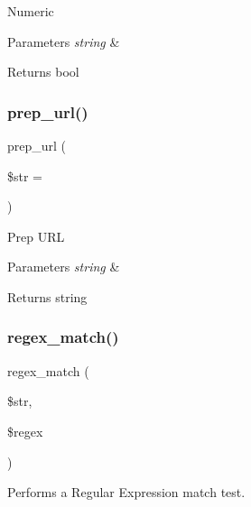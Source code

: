 Numeric


\begin{DoxyParams}{Parameters}
{\em string} & \\
\hline
\end{DoxyParams}
\begin{DoxyReturn}{Returns}
bool 
\end{DoxyReturn}
\mbox{\label{class_c_i___form__validation_a1218a70d68fe797013a53b3c7cd41d2f}} 
\subsubsection{\texorpdfstring{prep\+\_\+url()}{prep\_url()}}
{\footnotesize\ttfamily prep\+\_\+url (\begin{DoxyParamCaption}\item[{}]{\$str = {\ttfamily \textquotesingle{}\textquotesingle{}} }\end{DoxyParamCaption})}

Prep U\+RL


\begin{DoxyParams}{Parameters}
{\em string} & \\
\hline
\end{DoxyParams}
\begin{DoxyReturn}{Returns}
string 
\end{DoxyReturn}
\mbox{\label{class_c_i___form__validation_acef19e29276dbdd2c69dffd5ec635600}} 
\subsubsection{\texorpdfstring{regex\+\_\+match()}{regex\_match()}}
{\footnotesize\ttfamily regex\+\_\+match (\begin{DoxyParamCaption}\item[{}]{\$str,  }\item[{}]{\$regex }\end{DoxyParamCaption})}

Performs a Regular Expression match test.


